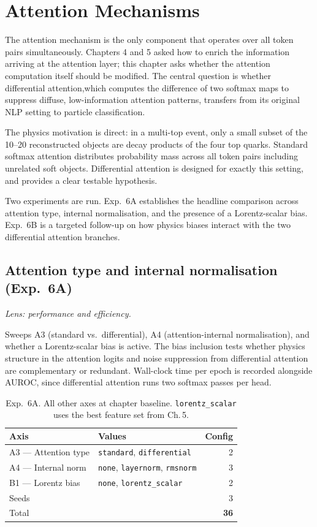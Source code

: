 \chapter{Attention Mechanisms}

The attention mechanism is the only component that operates over all
token pairs simultaneously. Chapters 4 and 5 asked how to enrich the
information arriving at the attention layer; this chapter asks whether
the attention computation itself should be modified. The central
question is whether differential attention,which computes the
difference of two softmax maps to suppress diffuse, low-information
attention patterns, transfers from its original NLP setting to
particle classification.

The physics motivation is direct: in a multi-top event, only a small
subset of the 10--20 reconstructed objects are decay products of the
four top quarks. Standard softmax attention distributes probability
mass across all token pairs including unrelated soft objects.
Differential attention is designed for exactly this setting, and
provides a clear testable hypothesis.

Two experiments are run. Exp.\ 6A establishes the headline comparison
across attention type, internal normalisation, and the presence of a
Lorentz-scalar bias. Exp.\ 6B is a targeted follow-up on how physics
biases interact with the two differential attention branches.

\section{Attention type and internal normalisation (Exp.\ 6A)}
\textit{Lens: performance and efficiency.}

Sweeps A3 (standard vs.\ differential), A4 (attention-internal
normalisation), and whether a Lorentz-scalar bias is active. The bias
inclusion tests whether physics structure in the attention logits and
noise suppression from differential attention are complementary or
redundant. Wall-clock time per epoch is recorded alongside AUROC, since
differential attention runs two softmax passes per head.

\begin{table}[h]
\centering\small
\begin{tabular}{llr}
\toprule
Axis & Values & Config \\
\midrule
A3 — Attention type & \texttt{standard}, \texttt{differential} & 2 \\
A4 — Internal norm  & \texttt{none}, \texttt{layernorm}, \texttt{rmsnorm} & 3 \\
B1 — Lorentz bias   & \texttt{none}, \texttt{lorentz\_scalar} & 2 \\
Seeds & & 3 \\
\midrule
Total & & \textbf{36} \\
\bottomrule
\end{tabular}
\caption{Exp.\ 6A. All other axes at chapter baseline.
\texttt{lorentz\_scalar} uses the best feature set from Ch.\,5.}
\end{table}

